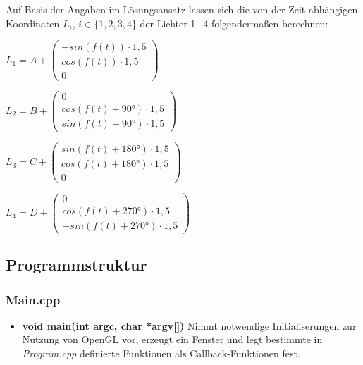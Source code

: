 \documentclass{scrartcl}
\begin{document}
            Auf Basis der Angaben im Lösungsansatz lassen sich die von der Zeit abhängigen Koordinaten $L_{i}$, $i\in \{1,2,3,4\}$ der Lichter 1$-$4 folgendermaßen berechnen: \par
            $L_{1} = A +   \begin{pmatrix}
                            -sin(f(t))\cdot 1,5 \\
                            cos(f(t))\cdot 1,5 \\
                            0
                        \end{pmatrix}$ \par
            $L_{2} = B +   \begin{pmatrix}
                            0 \\
                            cos(f(t)+\ang{90})\cdot 1,5 \\
                            sin(f(t)+\ang{90})\cdot 1,5 
                        \end{pmatrix}$ \par
            $L_{3} = C +   \begin{pmatrix}
                            sin(f(t)+\ang{180})\cdot 1,5 \\
                            cos(f(t)+\ang{180})\cdot 1,5 \\
                            0
                        \end{pmatrix}$ \par
            $L_{4} = D +   \begin{pmatrix}
                            0 \\
                            cos(f(t)+\ang{270})\cdot 1,5 \\
                            -sin(f(t)+\ang{270})\cdot 1,5
                        \end{pmatrix}$ \\

        \subsection{Programmstruktur}
            \subsubsection*{Main.cpp}
                \begin{itemize}
                    \item \textbf{void main(int argc, char *argv[])}
                    Nimmt notwendige Initialiserungen zur Nutzung von OpenGL vor, 
                    erzeugt ein Fenster und legt bestimmte in \textit{Program.cpp} definierte 
                    Funktionen als Callback-Funktionen fest.
                \end{itemize}
\end{document}

